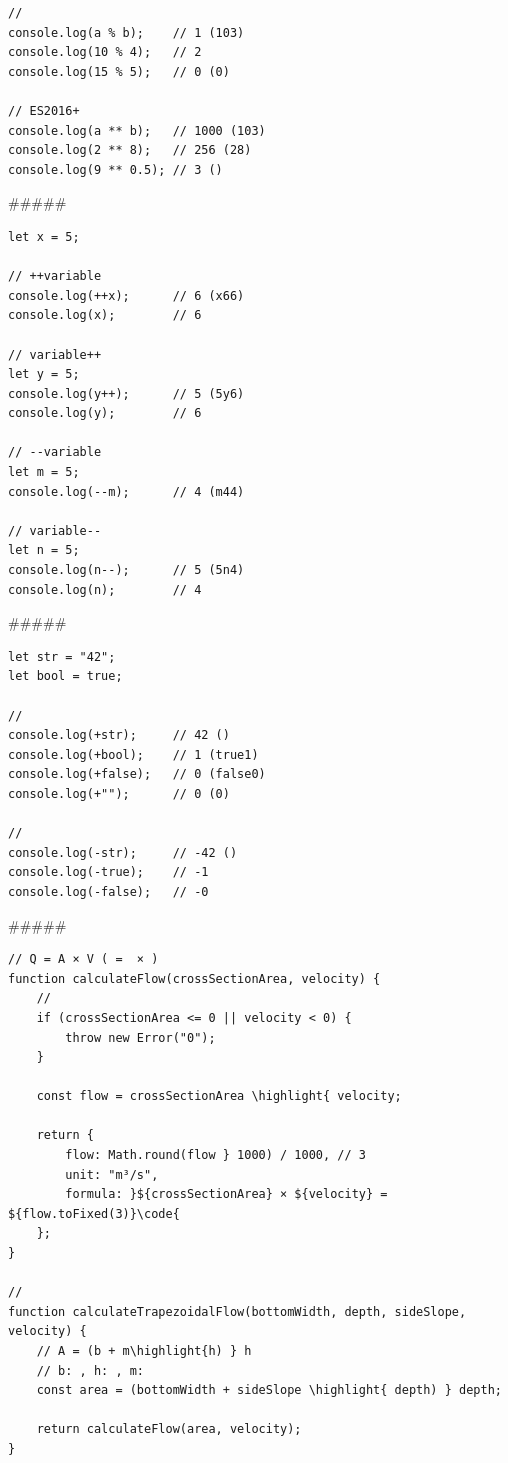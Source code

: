 {\begin{lstlisting}[style=javascript]
// 
console.log(a % b);    // 1 (103)
console.log(10 % 4);   // 2
console.log(15 % 5);   // 0 (0)

// ES2016+
console.log(a ** b);   // 1000 (103)
console.log(2 ** 8);   // 256 (28)
console.log(9 ** 0.5); // 3 ()
\end{lstlisting}

##### 

\begin{lstlisting}[style=javascript]
let x = 5;

// ++variable
console.log(++x);      // 6 (x66)
console.log(x);        // 6

// variable++  
let y = 5;
console.log(y++);      // 5 (5y6)
console.log(y);        // 6

// --variable
let m = 5;
console.log(--m);      // 4 (m44)

// variable--
let n = 5;
console.log(n--);      // 5 (5n4)
console.log(n);        // 4
\end{lstlisting}

##### 

\begin{lstlisting}[style=javascript]
let str = "42";
let bool = true;

// 
console.log(+str);     // 42 ()
console.log(+bool);    // 1 (true1)
console.log(+false);   // 0 (false0)
console.log(+"");      // 0 (0)

// 
console.log(-str);     // -42 ()
console.log(-true);    // -1
console.log(-false);   // -0
\end{lstlisting}

##### 

\important{}

\begin{lstlisting}[style=javascript]
// Q = A × V ( =  × )
function calculateFlow(crossSectionArea, velocity) {
    // 
    if (crossSectionArea <= 0 || velocity < 0) {
        throw new Error("0");
    }
    
    const flow = crossSectionArea \highlight{ velocity;
    
    return {
        flow: Math.round(flow } 1000) / 1000, // 3
        unit: "m³/s",
        formula: }${crossSectionArea} × ${velocity} = ${flow.toFixed(3)}\code{
    };
}

// 
function calculateTrapezoidalFlow(bottomWidth, depth, sideSlope, velocity) {
    // A = (b + m\highlight{h) } h
    // b: , h: , m: 
    const area = (bottomWidth + sideSlope \highlight{ depth) } depth;
    
    return calculateFlow(area, velocity);
}


\end{lstlisting}}
